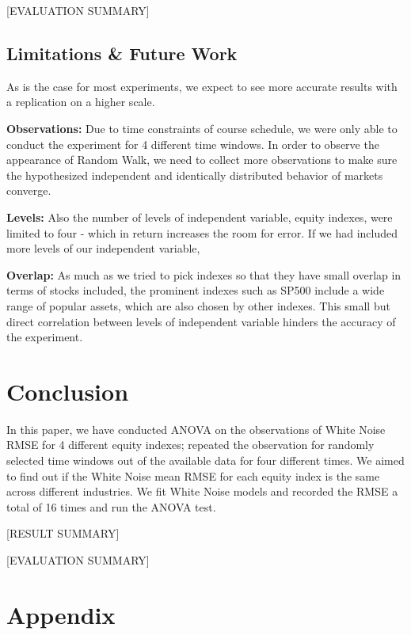 \documentclass{article}[12pt]
\begin{document}
            [EVALUATION SUMMARY]

            \subsection{Limitations \& Future Work}
                As is the case for most experiments, we expect to see more accurate results with a replication on a higher scale.

                \textbf{Observations:} Due to time constraints of course schedule, we were only able to conduct the experiment for 4 different time windows. In order to observe the appearance of Random Walk, we need to collect more observations to make sure the hypothesized independent and identically distributed behavior of markets converge.

                \textbf{Levels:} Also the number of levels of independent variable, equity indexes, were limited to four - which in return increases the room for error. If we had included more levels of our independent variable,
                
                \textbf{Overlap:} As much as we tried to pick indexes so that they have small overlap in terms of stocks included, the prominent indexes such as SP500 include a wide range of popular assets, which are also chosen by other indexes. This small but direct correlation between levels of independent variable hinders the accuracy of the experiment.

            \section{Conclusion}
                In this paper, we have conducted ANOVA on the observations of White Noise RMSE for 4 different equity indexes; repeated the observation for randomly selected time windows out of the available data for four different times. We aimed to find out if the White Noise mean RMSE for each equity index is the same across different industries. We fit White Noise models and recorded the RMSE a total of 16 times and run the ANOVA test.

                [RESULT SUMMARY]

                [EVALUATION SUMMARY]

        \section{Appendix}

    
    
\end{document}
